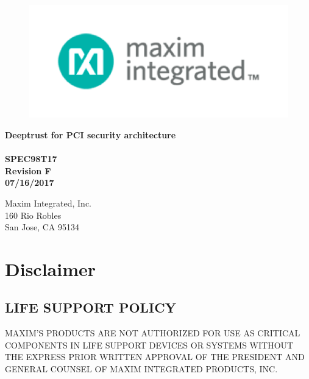 \documentclass[twoside]{book}
\newcommand\docrev{Revision F }
\newcommand\docref{SPEC98T17 }
\newcommand\docdate{07/16/2017 }
\newcommand{\+}{\discretionary{\mbox{\scriptsize$\hookleftarrow$}}{}{}}
\begin{document}
\hypersetup{pageanchor=false,
             bookmarksnumbered=true,
             pdfencoding=unicode
            }
\begin{titlepage}
\vspace*{7cm}
\begin{flushleft}
\begin{figure}[H]
\includegraphics[scale=1]{../../res/maxim-logo-header.png}
\end{figure}
\textbf{\Large{\bf{Deeptrust for P\+C\+I security architecture}\\}}
\textbf{\\\docref\\}
\textbf{\docrev\\}
\textbf{\docdate\\}
\end{flushleft}

\vspace*{7cm}
\begin{flushright}
Maxim Integrated, Inc.\\
160 Rio Robles\\
San Jose, CA 95134\\
\end{flushright}

\end{titlepage}

\section*{Disclaimer}

\subsection*{LIFE SUPPORT POLICY}
MAXIM’S PRODUCTS ARE NOT AUTHORIZED FOR USE AS CRITICAL COMPONENTS IN LIFE SUPPORT DEVICES OR SYSTEMS WITHOUT THE EXPRESS PRIOR WRITTEN APPROVAL OF THE PRESIDENT AND GENERAL COUNSEL OF MAXIM INTEGRATED PRODUCTS, INC.
\end{document}
